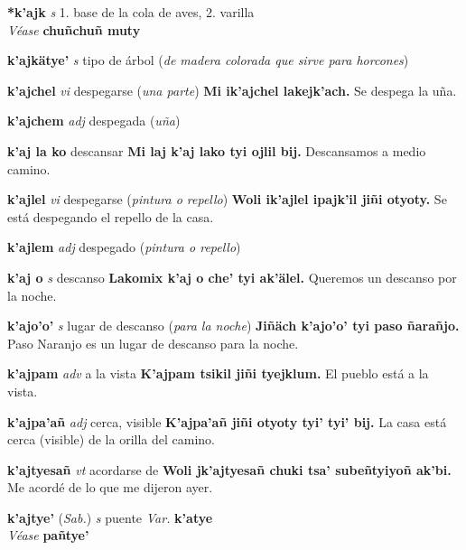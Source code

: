 \documentclass[10pt]{scrbook}
\newcommand{\entry}[1]{\textbf{#1}}
\newcommand{\onedefinition}[1]{#1.}
\newcommand{\partofspeech}[1]{\textit{#1}}
\newcommand{\spanishtranslation}[1]{#1}
\newcommand{\clarification}[1]{(\textit{#1})}
\newcommand{\cholexample}[1]{\textbf{#1}}
\newcommand{\exampletranslation}[1]{#1}
\newcommand{\alsosee}[1]{\\\textit{Véase} \textbf{#1}}
\newcommand{\relevantdialect}[1]{(\textit{#1})}
\newcommand{\variation}[1]{\textit{Var.} \textbf{#1}}
\begin{document}
\begin{multicols}{2}
\entry{*k'ajk}
\partofspeech{s}
\onedefinition{1}
\spanishtranslation{base de la cola de aves,}
\onedefinition{2}
\spanishtranslation{varilla}
\alsosee{chuñchuñ muty}

\entry{k'ajkätye'}
\partofspeech{s}
\spanishtranslation{tipo de árbol}
\clarification{de madera colorada que sirve para horcones}

\entry{k'ajchel}
\partofspeech{vi}
\spanishtranslation{despegarse}
\clarification{una parte}
\cholexample{Mi ik'ajchel lakejk'ach.}
\exampletranslation{Se despega la uña.}

\entry{k'ajchem}
\partofspeech{adj}
\spanishtranslation{despegada}
\clarification{uña}

\entry{k'aj la ko}
\spanishtranslation{descansar}
\cholexample{Mi laj k'aj lako tyi ojlil bij.}
\exampletranslation{Descansamos a medio camino.}

\entry{k'ajlel}
\partofspeech{vi}
\spanishtranslation{despegarse}
\clarification{pintura o repello}
\cholexample{Woli ik'ajlel ipajk'il jiñi otyoty.}
\exampletranslation{Se está despegando el repello de la casa.}

\entry{k'ajlem}
\partofspeech{adj}
\spanishtranslation{despegado}
\clarification{pintura o repello}

\entry{k'aj o}
\partofspeech{s}
\spanishtranslation{descanso}
\cholexample{Lakomix k'aj o che' tyi ak'älel.}
\exampletranslation{Queremos un descanso por la noche.}

\entry{k'ajo'o'}
\partofspeech{s}
\spanishtranslation{lugar de descanso}
\clarification{para la noche}
\cholexample{Jiñäch k'ajo'o' tyi paso ñarañjo.}
\exampletranslation{Paso Naranjo es un lugar de descanso para la noche.}

\entry{k'ajpam}
\partofspeech{adv}
\spanishtranslation{a la vista}
\cholexample{K'ajpam tsikil jiñi tyejklum.}
\exampletranslation{El pueblo está a la vista.}

\entry{k'ajpa'añ}
\partofspeech{adj}
\spanishtranslation{cerca, visible}
\cholexample{K'ajpa'añ jiñi otyoty tyi' tyi' bij.}
\exampletranslation{La casa está cerca (visible) de la orilla del camino.}

\entry{k'ajtyesañ}
\partofspeech{vt}
\spanishtranslation{acordarse de}
\cholexample{Woli jk'ajtyesañ chuki tsa' subeñtyiyoñ ak'bi.}
\exampletranslation{Me acordé de lo que me dijeron ayer.}

\entry{k'ajtye'}
\relevantdialect{Sab.}
\partofspeech{s}
\spanishtranslation{puente}
\variation{k'atye}
\alsosee{pañtye'}


\end{multicols}
\end{document}
